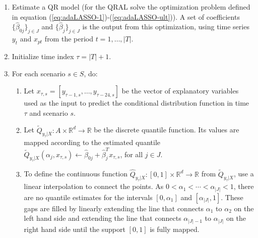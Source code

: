 \begin{enumerate}
	
	\item Estimate a QR model (for the QRAL solve the optimization problem defined in equation (\ref{eq:adaLASSO-1})-(\ref{eq:adaLASSO-ult})). 
	A set of coefficients $\{ \hat\beta_{0j} \}_{j \in J}$ and $\{ \hat\beta_{j} \}_{j \in J}$ is the output from this optimization, using time series $y_t$ and $x_{pt}$ from the period $t = 1, \dots, |T|$. 

	\item Initialize time index $\tau = |T| + 1$.
	
	\item For each scenario $s \in S$, do:
		\begin{enumerate}

		\item Let $x_{\tau,s} = [y_{\tau-1,s}, \dots, y_{\tau-24,s}]$ be the vector of explanatory variables used as the input to predict the conditional distribution function in time $\tau$ and scenario $s$.

		\item Let $\tilde{Q}_{y_{\tau}|X}:A \times \mathbb{R}^d \rightarrow \mathbb{R}$ be the discrete quantile function. Its values are mapped according to the estimated quantile $\tilde Q_{y_{\tau}|X}(\alpha_j, x_{\tau,s}) \leftarrow \hat\beta_{0j} + \hat\beta_j^T x_{\tau,s}$, for all $j \in J$.
		
		\item To define the continuous function $\hat{Q}_{y_{\tau}|X}:[0,1] \times \mathbb{R}^d \rightarrow \mathbb{R}$ from $\tilde Q_{y_{\tau}|X}$, use a linear interpolation to connect the points. As $0 < \alpha_1 < \cdots < \alpha_{|J|} < 1$, there are no quantile estimates for the intervals $[0,\alpha_1]$ and $[\alpha_{|J|},1]$. These gaps are filled by linearly extending the line that connects $\alpha_1$ to $\alpha_2$ on the left hand side and extending the line that connects $\alpha_{|J|-1}$ to $\alpha_{|J|}$ on the right hand side until the support $[0,1]$ is fully mapped.  

		

\end{enumerate}
\end{enumerate}
